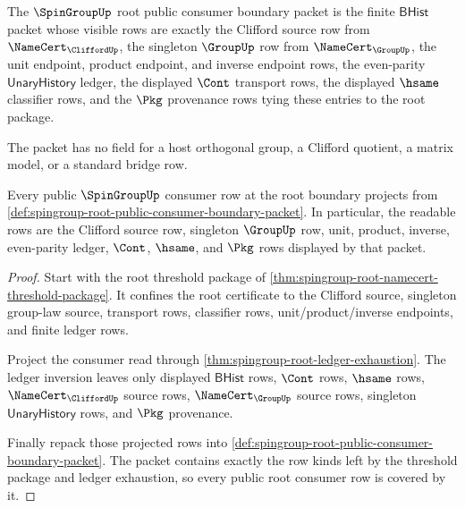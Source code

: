\begin{definition}
\label{def:spingroup-root-public-consumer-boundary-packet}
The $\SpinGroupUp$ root public consumer boundary packet is the finite
$\mathsf{BHist}$ packet whose visible rows are exactly the Clifford source row
from $\NameCert_{\CliffordUp}$, the singleton $\GroupUp$ row from
$\NameCert_{\GroupUp}$, the unit endpoint, product endpoint, and inverse
endpoint rows, the even-parity $\mathsf{UnaryHistory}$ ledger, the displayed
$\Cont$ transport rows, the displayed $\hsame$ classifier rows, and the
$\Pkg$ provenance rows tying these entries to the root package.

The packet has no field for a host orthogonal group, a Clifford quotient, a
matrix model, or a standard bridge row.
\end{definition}

\begin{theorem}
\label{thm:spingroup-root-public-consumer-boundary-coverage}
Every public $\SpinGroupUp$ consumer row at the root boundary projects from
\autoref{def:spingroup-root-public-consumer-boundary-packet}. In particular,
the readable rows are the Clifford source row, singleton $\GroupUp$ row, unit,
product, inverse, even-parity ledger, $\Cont$, $\hsame$, and $\Pkg$ rows
displayed by that packet.
\end{theorem}
\begin{proof}
Start with the root threshold package of
\autoref{thm:spingroup-root-namecert-threshold-package}. It confines the root
certificate to the Clifford source, singleton group-law source, transport
rows, classifier rows, unit/product/inverse endpoints, and finite ledger
rows.

Project the consumer read through
\autoref{thm:spingroup-root-ledger-exhaustion}. The ledger inversion leaves
only displayed $\mathsf{BHist}$ rows, $\Cont$ rows, $\hsame$ rows,
$\NameCert_{\CliffordUp}$ source rows, $\NameCert_{\GroupUp}$ source rows,
singleton $\mathsf{UnaryHistory}$ rows, and $\Pkg$ provenance.

Finally repack those projected rows into
\autoref{def:spingroup-root-public-consumer-boundary-packet}. The packet
contains exactly the row kinds left by the threshold package and ledger
exhaustion, so every public root consumer row is covered by it.
\end{proof}


